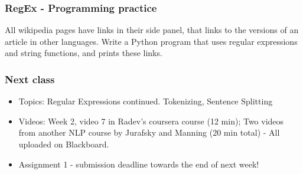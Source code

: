 \documentclass{beamer}
\begin{document}
\begin{frame}
\frametitle{RegEx - Programming practice}
All wikipedia pages have links in their side panel, that links to the versions of an article in other languages. Write a Python program that uses regular expressions and string functions, and prints these links. 
\end{frame}

\begin{frame}
\frametitle{Next class}
\begin{itemize}
\item Topics: Regular Expressions continued. Tokenizing, Sentence Splitting
\item Videos: Week 2, video 7 in Radev's coursera course (12 min); Two videos from another NLP course by Jurafsky and Manning (20 min total) - All uploaded on Blackboard.
\item Assignment 1 - submission deadline towards the end of next week! 
\end{itemize}
\end{frame}
\end{document}
